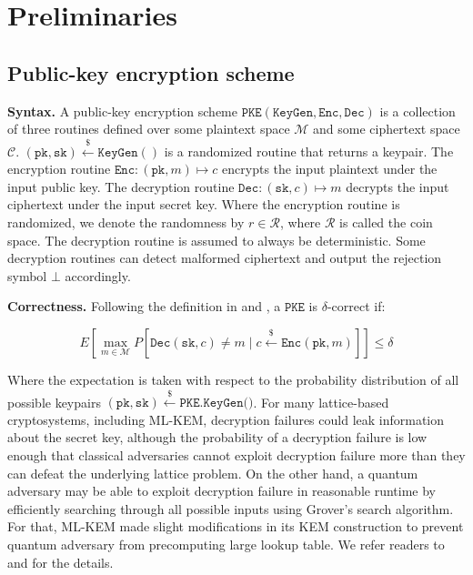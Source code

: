 \documentclass[journal=tches,submission]{iacrtrans}
\newcommand{\pke}{\texttt{PKE}}
\newcommand{\keygen}{\texttt{KeyGen}}
\newcommand{\encrypt}{\texttt{Enc}}
\newcommand{\decrypt}{\texttt{Dec}}
\newcommand{\pk}{\texttt{pk}}
\newcommand{\sk}{\texttt{sk}}
\newcommand{\leftsample}{\stackrel{\$}{\leftarrow}}
\begin{document}

\section{Preliminaries}

\subsection{Public-key encryption scheme}
\textbf{Syntax.} A public-key encryption scheme $\pke(\keygen, \encrypt, \decrypt)$ is a collection of three routines defined over some plaintext space $\mathcal{M}$ and some ciphertext space $\mathcal{C}$. $(\pk, \sk) \leftsample \keygen()$ is a randomized routine that returns a keypair. The encryption routine $\encrypt: (\pk, m) \mapsto c$ encrypts the input plaintext under the input public key. The decryption routine $\decrypt: (\sk, c) \mapsto m$ decrypts the input ciphertext under the input secret key. Where the encryption routine is randomized, we denote the randomness by $r \in \mathcal{R}$, where $\mathcal{R}$ is called the coin space. The decryption routine is assumed to always be deterministic. Some decryption routines can detect malformed ciphertext and output the rejection symbol $\bot$ accordingly.

\textbf{Correctness.} Following the definition in \cite{DBLP:conf/eurocrypt/DworkNR04} and \cite{hofheinz2017modular}, a $\pke$ is $\delta$-correct if:

\begin{equation*}
    E\left[\max_{m \in \mathcal{M}} P\left[\decrypt(\sk, c) \neq m \mid c \leftsample \encrypt(\pk, m)\right]\right] \leq \delta
\end{equation*}

Where the expectation is taken with respect to the probability distribution of all possible keypairs $(\pk, \sk) \leftsample \texttt{PKE.KeyGen()}$. For many lattice-based cryptosystems, including ML-KEM, decryption failures could leak information about the secret key, although the probability of a decryption failure is low enough that classical adversaries cannot exploit decryption failure more than they can defeat the underlying lattice problem. On the other hand, a quantum adversary may be able to exploit decryption failure in reasonable runtime by efficiently searching through all possible inputs using Grover's search algorithm. For that, ML-KEM made slight modifications in its KEM construction to prevent quantum adversary from precomputing large lookup table. We refer readers to \cite{avanzi2019crystals} and \cite{DBLP:conf/eurosp/BosDKLLSSSS18} for the details.
\end{document}
